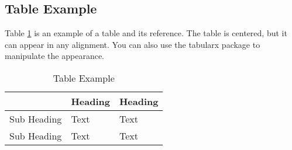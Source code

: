 \subsection{Table Example}

Table \ref{table:table-example} is an example of a table and its reference. The table is centered, but it can appear in any alignment. You can also use the tabularx package to manipulate the appearance.

\vspace{0.25cm}

\begin{table}[ht]
    \centering
    \begin{tabular}{l|l|l|}
        \cline{2-3}
                                          & \textbf{Heading} & \textbf{Heading} \\ \hline
        \multicolumn{1}{|l|}{Sub Heading} & Text             & Text             \\ \hline
        \multicolumn{1}{|l|}{Sub Heading} & Text             & Text             \\ \hline
    \end{tabular}
    \caption{Table Example}
    \label{table:table-example}
\end{table}

